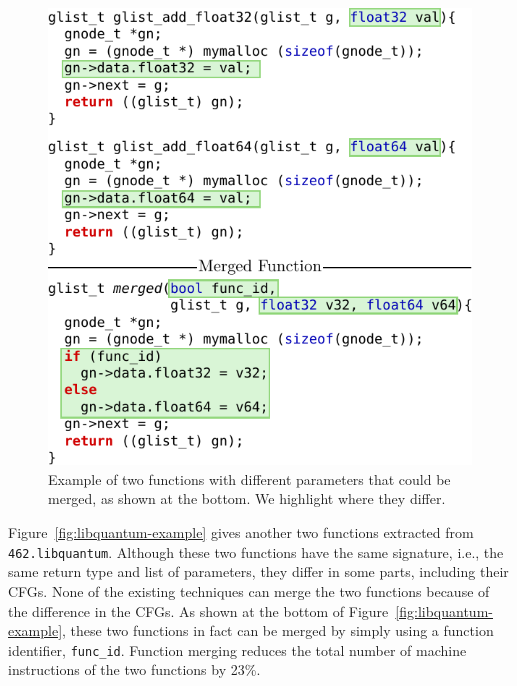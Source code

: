 \begin{figure}[t!]
  \centering
  \includegraphics[width=.95\linewidth]{figs/sphinx-example.pdf}
  \caption{Example of two functions with different parameters that could be merged, as shown at the bottom.
           We highlight where they differ.}
  \label{fig:sphinx-example}
\end{figure}


Figure~\ref{fig:libquantum-example} gives another two functions extracted from \texttt{462.libquantum}. Although these two functions have
the same signature, i.e., the same return type and list of parameters, they differ in some parts, including their CFGs. None of the
existing techniques can merge the two functions because of the difference in the CFGs. As shown at the bottom of
Figure~\ref{fig:libquantum-example}, these two functions in fact can be merged by simply using a function identifier, \texttt{func\_id}.
Function merging reduces the total number of machine instructions of the two functions by 23\%.

